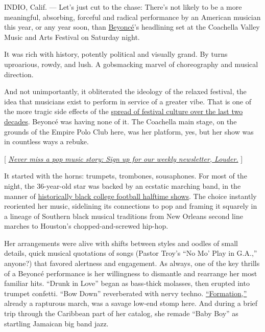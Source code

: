 INDIO, Calif. --- Let's just cut to the chase: There's not likely to be
a more meaningful, absorbing, forceful and radical performance by an
American musician this year, or any year soon, than
\href{https://www.nytimes.com/topic/person/beyonce-knowles}{Beyoncé}'s
headlining set at the Coachella Valley Music and Arts Festival on
Saturday night.

It was rich with history, potently political and visually grand. By
turns uproarious, rowdy, and lush. A gobsmacking marvel of choreography
and musical direction.

And not unimportantly, it obliterated the ideology of the relaxed
festival, the idea that musicians exist to perform in service of a
greater vibe. That is one of the more tragic side effects of the
\href{https://www.nytimes.com/2016/03/19/arts/music/summer-music-festivals.html}{spread
of festival culture over the last two decades}. Beyoncé was having none
of it. The Coachella main stage, on the grounds of the Empire Polo Club
here, was her platform, yes, but her show was in countless ways a
rebuke.

{[} \href{https://www.nytimes.com/newsletters/louder}{\emph{Never miss a
pop music story: Sign up for our weekly newsletter, Louder.}} {]}

It started with the horns: trumpets, trombones, sousaphones. For most of
the night, the 36-year-old star was backed by an ecstatic marching band,
in the manner of
\href{https://www.nytimes.com/2017/01/29/arts/music/honda-battle-of-the-bands.html}{historically
black college football halftime shows}. The choice instantly reoriented
her music, sidelining its connections to pop and framing it squarely in
a lineage of Southern black musical traditions from New Orleans second
line marches to Houston's chopped-and-screwed hip-hop.

Her arrangements were alive with shifts between styles and oodles of
small details, quick musical quotations of songs (Pastor Troy's ``No Mo'
Play in G.A.,'' anyone?) that favored alertness and engagement. As
always, one of the key thrills of a Beyoncé performance is her
willingness to dismantle and rearrange her most familiar hits. ``Drunk
in Love'' began as bass-thick molasses, then erupted into trumpet
confetti. ``Bow Down'' reverberated with nervy techno.
\href{https://www.nytimes.com/2016/02/07/arts/music/beyonce-formation-super-bowl-video.html}{``Formation,''}
already a rapturous march, was a savage low-end stomp here. And during a
brief trip through the Caribbean part of her catalog, she remade ``Baby
Boy'' as startling Jamaican big band jazz.


